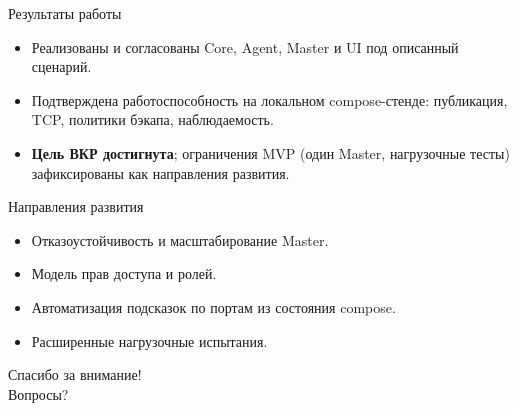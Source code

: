 \documentclass[aspectratio=169,12pt]{beamer}
\begin{document}
\begin{frame}{Результаты работы}
  \begin{itemize}
    \item Реализованы и согласованы Core, Agent, Master и UI под описанный сценарий.
    \item Подтверждена работоспособность на локальном compose-стенде: публикация, TCP, политики бэкапа, наблюдаемость.
    \item \textbf{Цель ВКР достигнута}; ограничения MVP (один Master, нагрузочные тесты) зафиксированы как направления развития.
  \end{itemize}
\end{frame}

\begin{frame}{Направления развития}
  \begin{itemize}
    \item Отказоустойчивость и масштабирование Master.
    \item Модель прав доступа и ролей.
    \item Автоматизация подсказок по портам из состояния compose.
    \item Расширенные нагрузочные испытания.
  \end{itemize}
\end{frame}

\begin{frame}
  \centering
  \Large Спасибо за внимание!\\[1.2em]
  \normalsize Вопросы?
\end{frame}
\end{document}
